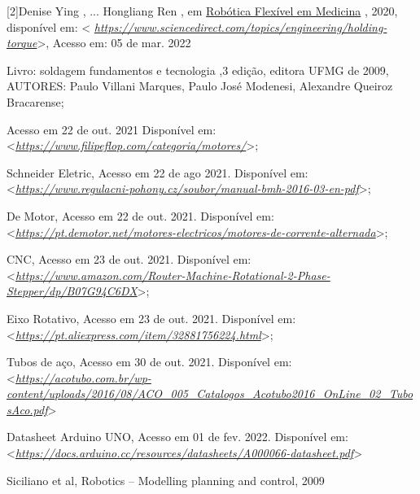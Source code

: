 \documentclass[]{article}
\begin{document}
{[}2{]}Denise Ying , ... Hongliang Ren , em
\href{https://www.sciencedirect.com/book/9780128175958/flexible-robotics-in-medicine}{Robótica
Flexível em Medicina} , 2020, disponível em: \textless{}
\href{https://www.sciencedirect.com/topics/engineering/holding-torque}{\emph{https://www.sciencedirect.com/topics/engineering/holding-torque}}\textgreater{},
Acesso em: 05 de mar. 2022

Livro: soldagem fundamentos e tecnologia ,3 edição, editora UFMG de
2009, AUTORES: Paulo Villani Marques, Paulo José Modenesi, Alexandre
Queiroz Bracarense;

Acesso em 22 de out. 2021 Disponível em:
\textless{}\href{https://www.filipeflop.com/categoria/motores/}{\emph{https://www.filipeflop.com/categoria/motores/}}\textgreater{};

Schneider Eletric, Acesso em 22 de ago 2021. Disponível em:
\textless{}\href{https://www.regulacni-pohony.cz/soubor/manual-bmh-2016-03-en-pdf}{\emph{https://www.regulacni-pohony.cz/soubor/manual-bmh-2016-03-en-pdf}}\textgreater{};

De Motor, Acesso em 22 de out. 2021. Disponível em:
\textless{}\href{https://pt.demotor.net/motores-electricos/motores-de-corrente-alternada}{\emph{https://pt.demotor.net/motores-electricos/motores-de-corrente-alternada}}\textgreater{};

CNC, Acesso em 23 de out. 2021. Disponível em:
\textless{}\href{https://www.amazon.com/Router-Machine-Rotational-2-Phase-Stepper/dp/B07G94C6DX}{\emph{https://www.amazon.com/Router-Machine-Rotational-2-Phase-Stepper/dp/B07G94C6DX}}\textgreater{};

Eixo Rotativo, Acesso em 23 de out. 2021. Disponível em:
\textless{}\href{https://pt.aliexpress.com/item/32881756224.html}{\emph{https://pt.aliexpress.com/item/32881756224.html}}\textgreater{};

Tubos de aço, Acesso em 30 de out. 2021. Disponível em:
\textless{}\href{https://acotubo.com.br/wp-content/uploads/2016/08/ACO_005_Catalogos_Acotubo2016_OnLine_02_TubosAco.pdf}{\emph{https://acotubo.com.br/wp-content/uploads/2016/08/ACO\_005\_Catalogos\_Acotubo2016\_OnLine\_02\_TubosAco.pdf}}\textgreater{}

Datasheet Arduino UNO, Acesso em 01 de fev. 2022. Disponível em:
\textless{}\href{https://docs.arduino.cc/resources/datasheets/A000066-datasheet.pdf}{\emph{https://docs.arduino.cc/resources/datasheets/A000066-datasheet.pdf}}\textgreater{}

Siciliano et al, Robotics -- Modelling planning and control, 2009
\end{document}
